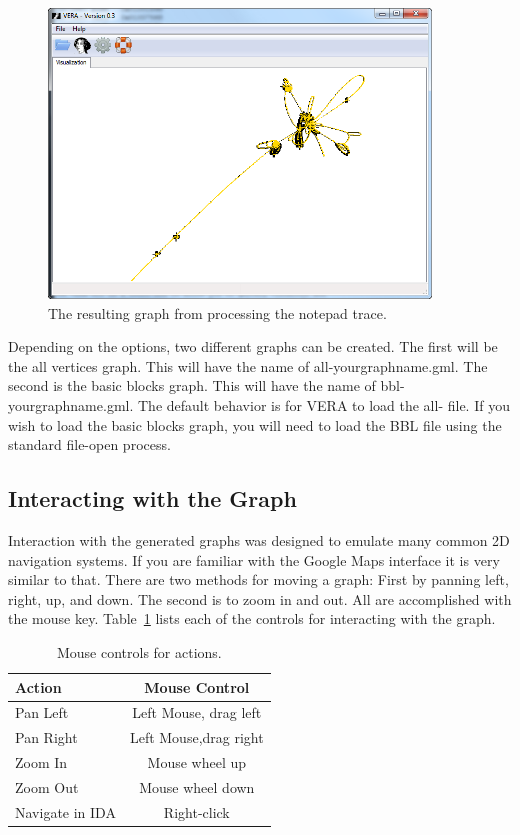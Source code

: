 \documentclass[11pt]{article}
\begin{document}
\begin{figure}[htb]
  \centering
  \includegraphics[width=4.0in]{vera-notepad-trace.png}
  \caption{The resulting graph from processing the notepad trace.}\label{vera:notepad-trace}
\end{figure}

Depending on the options, two different graphs can be created. The
first will be the all vertices graph. This will have the name of
all-yourgraphname.gml. The second is the basic blocks graph. This will
have the name of bbl-yourgraphname.gml. The default behavior is for
VERA to load the all- file. If you wish to load the basic blocks
graph, you will need to load the BBL file using the standard file-open
process.

\subsection{Interacting with the Graph}

Interaction with the generated graphs was designed to emulate many
common 2D navigation systems. If you are familiar with the Google Maps
interface it is very similar to that. There are two methods for moving
a graph: First by panning left, right, up, and down. The second is to
zoom in and out. All are accomplished with the mouse
key. Table~\ref{table:controls} lists each of the controls for
interacting with the graph.

\begin{table}[htb]
\centering
\begin{tabular}{ | l | c | }
\hline
\bf{Action} & \bf{Mouse Control}\\
\hline
Pan Left & Left Mouse, drag left \\
Pan Right & Left Mouse,drag right \\
Zoom In & Mouse wheel up \\
Zoom Out & Mouse wheel down \\
Navigate in IDA & Right-click \\
\hline

\end{tabular}\caption{Mouse controls for actions.}\label{table:controls}
\end{table}
\end{document}
